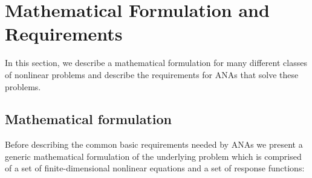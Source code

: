 %
\section{Mathematical Formulation and Requirements}
\label{tsfcorenonlin:sec:math}
%

In this section, we describe a mathematical formulation for many
different classes of nonlinear problems and describe the requirements
for ANAs that solve these problems.

%
\subsection{Mathematical formulation}
\label{tsfcorenonlin:sec:math_form}
%

Before describing the common basic requirements needed by ANAs we
present a generic mathematical formulation of the underlying problem
which is comprised of a set of finite-dimensional nonlinear equations
and a set of response functions:

